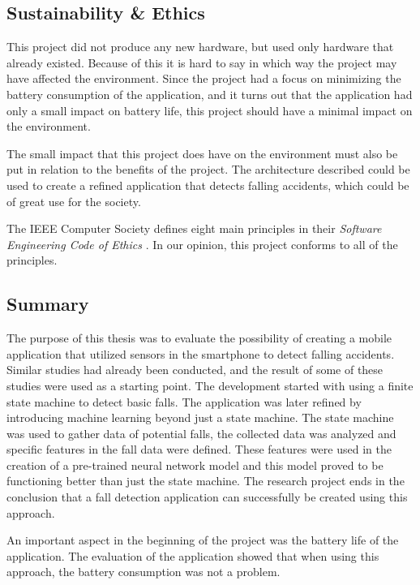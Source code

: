 \documentclass[12pt, a4paper, onecolumn]{article}
\begin{document}
	\subsection{Sustainability \& Ethics}
	
	This project did not produce any new hardware, but used only hardware that already existed. Because of this it is hard to say in which way the project may have affected the environment. Since the project had a focus on minimizing the battery consumption of the application, and it turns out that the application had only a small impact on battery life, this project should have a minimal impact on the environment.
	
	The small impact that this project does have on the environment must also be put in relation to the benefits of the project. The architecture described could be used to create a refined application that detects falling accidents, which could be of great use for the society.
	
	The IEEE Computer Society defines eight main principles in their \textit{Software Engineering Code of Ethics} \cite{ieee-ethics}. In our opinion, this project conforms to all of the principles.
	
	\subsection{Summary}
	
	The purpose of this thesis was to evaluate the possibility of creating a mobile application that utilized sensors in the smartphone to detect falling accidents. Similar studies had already been conducted, and the result of some of these studies were used as a starting point. The development started with using a finite state machine to detect basic falls. The application was later refined by introducing machine learning beyond just a state machine. The state machine was used to gather data of potential falls, the collected data was analyzed and specific features in the fall data were defined. These features were used in the creation of a pre-trained neural network model and this model proved to be functioning better than just the state machine. The research project ends in the conclusion that a fall detection application can successfully be created using this approach.
	
	An important aspect in the beginning of the project was the battery life of the application. The evaluation of the application showed that when using this approach, the battery consumption was not a problem.
	
\end{document}
